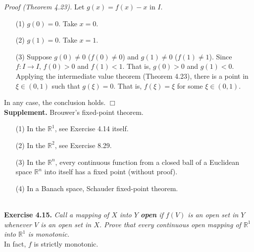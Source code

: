 \documentclass{article}
\begin{document}
\emph{Proof (Theorem 4.23).}
Let $g(x) = f(x) - x$ in $I$.

\begin{enumerate}
\item[(1)]
$g(0) = 0$. Take $x = 0$.
\item[(2)]
$g(1) = 0$. Take $x = 1$.
\item[(3)]
Suppose $g(0) \neq 0$ ($f(0) \neq 0$) and $g(1) \neq 0$ ($f(1) \neq 1$).
Since $f: I \to I$, $f(0) > 0$ and $f(1) < 1$. That is, $g(0) > 0$ and $g(1) < 0$.
Applying the intermediate value theorem (Theorem 4.23),
there is a point in $\xi \in (0, 1)$ such that $g(\xi) = 0$.
That is, $f(\xi) = \xi$ for some $\xi \in (0,1)$.
\end{enumerate}
In any case, the conclusion holds.
$\Box$ \\



\textbf{Supplement.} Brouwer's fixed-point theorem.
\begin{enumerate}
  \item[(1)]
    In the $\mathbb{R}^1$, see Exercise 4.14 itself.

  \item[(2)]
    In the $\mathbb{R}^2$, see Exercise 8.29.

  \item[(3)]
    In the $\mathbb{R}^n$,
    every continuous function from a closed ball of a Euclidean space $\mathbb{R}^n$
    into itself has a fixed point (without proof).

  \item[(4)]
    In a Banach space, Schauder fixed-point theorem. \\\\
\end{enumerate}






\textbf{Exercise 4.15.}
\emph{Call a mapping of $X$ into $Y$ \textbf{open} if $f(V)$ is an open set in $Y$
whenever $V$ is an open set in $X$.
Prove that every continuous open mapping of $\mathbb{R}^1$ into $\mathbb{R}^1$
is monotonic.} \\

In fact, $f$ is strictly monotonic. \\
\end{document}
